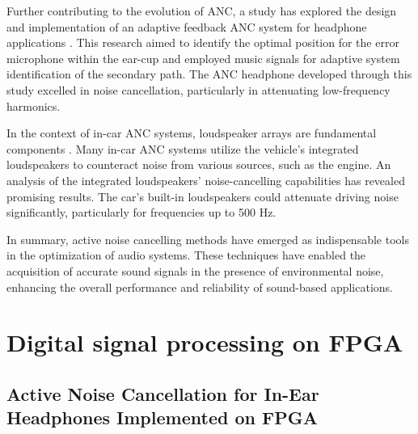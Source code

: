Further contributing to the evolution of ANC, a study has explored the design and implementation of an adaptive feedback ANC system for headphone applications \cite{ANC_Headphone_2}. This research aimed to identify the optimal position for the error microphone within the ear-cup and employed music signals for adaptive system identification of the secondary path. The ANC headphone developed through this study excelled in noise cancellation, particularly in attenuating low-frequency harmonics.

In the context of in-car ANC systems, loudspeaker arrays are fundamental components \cite{ANC_Car}. Many in-car ANC systems utilize the vehicle's integrated loudspeakers to counteract noise from various sources, such as the engine. An analysis of the integrated loudspeakers' noise-cancelling capabilities has revealed promising results. The car's built-in loudspeakers could attenuate driving noise significantly, particularly for frequencies up to 500 Hz.

In summary, active noise cancelling methods have emerged as indispensable tools in the optimization of audio systems. These techniques have enabled the acquisition of accurate sound signals in the presence of environmental noise, enhancing the overall performance and reliability of sound-based applications.

\section{Digital signal processing on FPGA}

\subsection{Active Noise Cancellation for In-Ear Headphones Implemented on FPGA}

